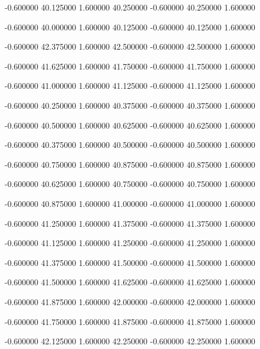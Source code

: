  {-0.600000} {40.125000} {1.600000} {40.250000} {-0.600000} {40.250000} {1.600000}

 {-0.600000} {40.000000} {1.600000} {40.125000} {-0.600000} {40.125000} {1.600000}

 {-0.600000} {42.375000} {1.600000} {42.500000} {-0.600000} {42.500000} {1.600000}

 {-0.600000} {41.625000} {1.600000} {41.750000} {-0.600000} {41.750000} {1.600000}

 {-0.600000} {41.000000} {1.600000} {41.125000} {-0.600000} {41.125000} {1.600000}

 {-0.600000} {40.250000} {1.600000} {40.375000} {-0.600000} {40.375000} {1.600000}

 {-0.600000} {40.500000} {1.600000} {40.625000} {-0.600000} {40.625000} {1.600000}

 {-0.600000} {40.375000} {1.600000} {40.500000} {-0.600000} {40.500000} {1.600000}

 {-0.600000} {40.750000} {1.600000} {40.875000} {-0.600000} {40.875000} {1.600000}

 {-0.600000} {40.625000} {1.600000} {40.750000} {-0.600000} {40.750000} {1.600000}

 {-0.600000} {40.875000} {1.600000} {41.000000} {-0.600000} {41.000000} {1.600000}

 {-0.600000} {41.250000} {1.600000} {41.375000} {-0.600000} {41.375000} {1.600000}

 {-0.600000} {41.125000} {1.600000} {41.250000} {-0.600000} {41.250000} {1.600000}

 {-0.600000} {41.375000} {1.600000} {41.500000} {-0.600000} {41.500000} {1.600000}

 {-0.600000} {41.500000} {1.600000} {41.625000} {-0.600000} {41.625000} {1.600000}

 {-0.600000} {41.875000} {1.600000} {42.000000} {-0.600000} {42.000000} {1.600000}

 {-0.600000} {41.750000} {1.600000} {41.875000} {-0.600000} {41.875000} {1.600000}

 {-0.600000} {42.125000} {1.600000} {42.250000} {-0.600000} {42.250000} {1.600000}


